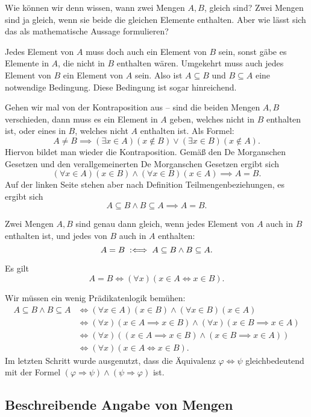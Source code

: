 Wie können wir denn wissen, wann zwei Mengen $A,B$, gleich sind?
Zwei Mengen sind ja gleich, wenn sie beide die gleichen Elemente
enthalten. Aber wie lässt sich das als mathematische Aussage
formulieren?

Jedes Element von $A$ muss doch auch ein Element von $B$ sein,
sonst gäbe es Elemente in $A$, die nicht in $B$ enthalten wären.
Umgekehrt muss auch jedes Element von $B$ ein Element von $A$ sein.
Also ist $A\subseteq B$ und $B\subseteq A$ eine notwendige Bedingung.
Diese Bedingung ist sogar hinreichend.

Gehen wir mal von der Kontraposition aus -- sind die beiden Mengen
$A,B$ verschieden, dann muss es ein Element in $A$ geben, welches nicht
in $B$ enthalten ist, oder eines in $B$, welches nicht $A$ enthalten
ist. Als Formel:%
\[A\ne B \implies (\exists x\in A)(x\notin B)\lor(\exists x\in B)(x\notin A).\]
Hiervon bildet man wieder die Kontraposition. Gemäß den
De Morganschen Gesetzen und den verallgemeinerten
De Morganschen Gesetzen ergibt sich%
\[(\forall x\in A)(x\in B)\land(\forall x\in B)(x\in A)\implies A=B.\]
Auf der linken Seite stehen aber nach Definition
Teilmengenbeziehungen, es ergibt sich%
\[A\subseteq B\land B\subseteq A\implies A=B.\]
\begin{Definition}
Zwei Mengen $A,B$ sind genau dann gleich, wenn jedes Element von
$A$ auch in $B$ enthalten ist, und jedes von $B$ auch in $A$ enthalten:%
\[A=B\;:\Longleftrightarrow\; A\subseteq B\land B\subseteq A.\]
\end{Definition}
\begin{Satz}\label{set-eq}
Es gilt
\[A=B\iff (\forall x)(x\in A\iff x\in B).\]
\end{Satz}
 Wir müssen ein wenig Prädikatenlogik bemühen:%
\begin{align*}
A\subseteq B\land B\subseteq A
&\iff (\forall x\in A)(x\in B)\land(\forall x\in B)(x\in A)\\
&\iff (\forall x)(x\in A\implies x\in B)\land(\forall x)(x\in B\implies x\in A)\\
&\iff (\forall x)((x\in A\implies x\in B)\land (x\in B\implies x\in A))\\
&\iff (\forall x)(x\in A\iff x\in B).
\end{align*}
Im letzten Schritt wurde ausgenutzt, dass die Äquivalenz
$\varphi\Leftrightarrow\psi$ gleichbedeutend
mit der Formel $(\varphi\Rightarrow\psi)\land(\psi\Rightarrow\varphi)$
ist.\;\qedsymbol

\subsection{Beschreibende Angabe von Mengen}

